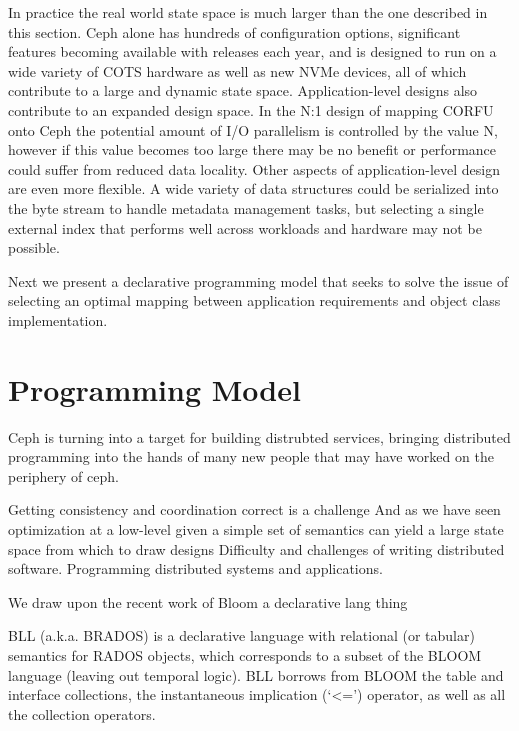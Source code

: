 \documentclass[10pt,twocolumn]{article}
\begin{document}
In practice the real world state space is much larger than the one described
in this section. Ceph alone has hundreds of configuration options, significant
features becoming available with releases each year, and is designed to run on
a wide variety of COTS hardware as well as new NVMe devices, all of which
contribute to a large and dynamic state space. Application-level designs
also contribute to an expanded design space. In the N:1 design of mapping
CORFU onto Ceph the potential amount of I/O parallelism is controlled by 
the value N, however if this value becomes too large there may be no benefit
or performance could suffer from reduced data locality. Other aspects of
application-level design are even more flexible. A wide variety of data
structures could be serialized into the byte stream to handle metadata
management tasks, but selecting a single external index that performs well
across workloads and hardware may not be possible.

Next we present a declarative programming model that seeks to solve the issue
of selecting an optimal mapping between application requirements and object
class implementation.

\section{Programming Model}

Ceph is turning into a target for building distrubted services, bringing
distributed programming into the hands of many new people that may have
worked on the periphery of ceph.

Getting consistency and coordination correct is a challenge And as we have seen
optimization at a low-level given a simple set of semantics can yield a large
state space from which to draw designs Difficulty and challenges of writing
distributed software.  Programming distributed systems and applications.

We draw upon the recent work of Bloom a declarative lang thing

BLL (a.k.a. BRADOS) is a declarative language with relational (or tabular)
semantics for RADOS objects, which corresponds to a subset of the BLOOM
language (leaving out temporal logic). BLL borrows from BLOOM the table and
interface collections, the instantaneous implication (‘<=’) operator, as well
as all the collection operators.
\end{document}
